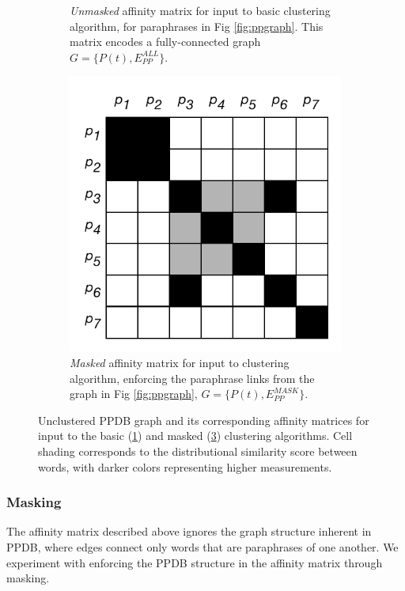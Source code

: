 \documentclass[11pt]{article}
\begin{document}
\begin{figure}
\begin{subfigure}[t]{0.36\textwidth}
		\caption{\textit{Unmasked} affinity matrix for input to basic clustering algorithm, for paraphrases in Fig \ref{fig:ppgraph}. This matrix encodes a fully-connected graph $G = \{P(t), E_{PP}^{ALL}\}$.}
		\label{fig:ppmatall}
	\end{subfigure}
	\hfill%
	\begin{subfigure}[t]{0.36\textwidth}
		\includegraphics[width=\textwidth]{images/pp_mat_mask.pdf}
		\caption{\textit{Masked} affinity matrix for input to clustering algorithm, enforcing the paraphrase links from the graph in Fig \ref{fig:ppgraph}, $G = \{P(t), E_{PP}^{MASK}\}$.}
		\label{fig:ppmatmask}
	\end{subfigure}
	\caption{Unclustered PPDB graph and its corresponding affinity matrices for input to the basic (\ref{fig:ppmatall}) and masked (\ref{fig:ppmatmask}) clustering algorithms. Cell shading corresponds to the distributional similarity score between words, with darker colors representing higher measurements. }
\end{figure}

\subsubsection{Masking}

The affinity matrix described above ignores the graph structure inherent in PPDB, where edges connect only words that are paraphrases of one another. We experiment with enforcing the PPDB structure in the affinity matrix through masking. 
\end{document}
